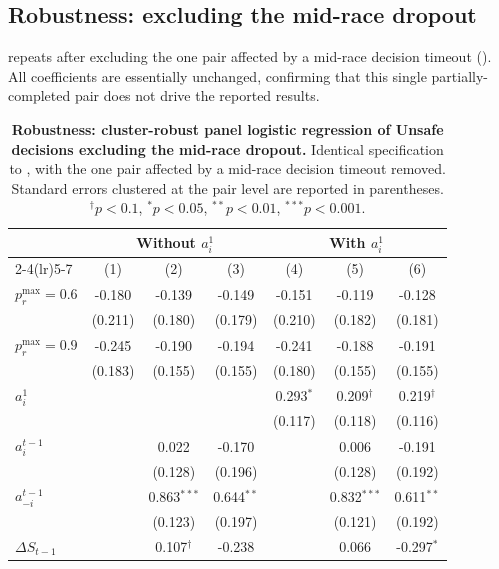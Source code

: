 \documentclass[pdflatex,sn-mathphys-ay]{sn-jnl}
\theoremstyle{thmstyleone}
\theoremstyle{thmstyletwo}
\theoremstyle{thmstylethree}
\begin{document}
\subsection{Robustness: excluding the mid-race dropout}
\label{si:sec:data-analysis-robustness}

 repeats  after excluding the one pair affected by a mid-race decision timeout (). All coefficients are essentially unchanged, confirming that this single partially-completed pair does not drive the reported results.

\begin{table}[h]
\centering
\small
\caption{\textbf{Robustness: cluster-robust panel logistic regression of Unsafe decisions excluding the mid-race dropout.} Identical specification to , with the one pair affected by a mid-race decision timeout removed. Standard errors clustered at the pair level are reported in parentheses. \(^{\dagger}p<0.1\), \(^{*}p<0.05\), \(^{**}p<0.01\), \(^{***}p<0.001\).}
\label{tab:si:cluster_logit_unsafe_no_dropout}
\begin{tabular}{lcccccc}
\toprule
 & \multicolumn{3}{c}{Without \(a_i^1\)}  & \multicolumn{3}{c}{With \(a_i^1\)} \\
\cmidrule(lr){2-4}\cmidrule(lr){5-7}
 & (1) & (2) & (3) & (4) & (5) & (6) \\
\midrule
\(p_r^{\max}=0.6\) & -0.180 & -0.139 & -0.149 & -0.151 & -0.119 & -0.128 \\
 & (0.211) & (0.180) & (0.179) & (0.210) & (0.182) & (0.181) \\
\(p_r^{\max}=0.9\) & -0.245 & -0.190 & -0.194 & -0.241 & -0.188 & -0.191 \\
 & (0.183) & (0.155) & (0.155) & (0.180) & (0.155) & (0.155) \\
\(a_i^1\) &  &  &  & 0.293\(^{*}\) & 0.209\(^{\dagger}\) & 0.219\(^{\dagger}\) \\
 &  &  &  & (0.117) & (0.118) & (0.116) \\
\(a_i^{t-1}\) &  & 0.022 & -0.170 &  & 0.006 & -0.191 \\
 &  & (0.128) & (0.196) &  & (0.128) & (0.192) \\
\(a_{-i}^{t-1}\) &  & 0.863\(^{***}\) & 0.644\(^{**}\) &  & 0.832\(^{***}\) & 0.611\(^{**}\) \\
 &  & (0.123) & (0.197) &  & (0.121) & (0.192) \\
\(\Delta S_{t-1}\) &  & 0.107\(^{\dagger}\) & -0.238 &  & 0.066 & -0.297\(^{*}\) \\

\end{tabular}
\end{table}
\end{document}
